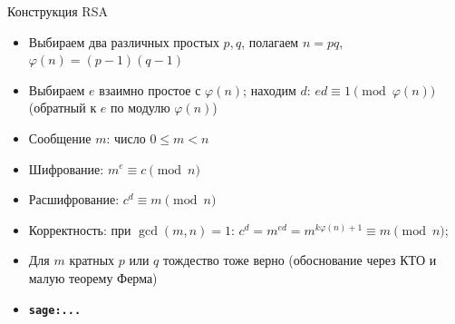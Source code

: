 \documentclass[serif, aspectratio=169]{beamer}
\newcommand{\sagemark}{%
  \textcolor{green!40!black}{\textbf{\texttt{sage:...}}}%
}
\begin{document}
\begin{frame}{Конструкция RSA}
    \begin{itemize}
        \item Выбираем два различных простых $p, q$, полагаем $n=pq$, $\varphi(n) = (p-1)(q-1)$
        \item Выбираем $e$ взаимно простое с $\varphi(n)$; находим $d$: $ed\equiv1\pmod{\varphi(n)}$ (обратный к $e$ по модулю $\varphi(n)$)
        \item Сообщение $m$: число $0\le m<n$
        \item Шифрование: $m^e \equiv c \pmod n$
        \item Расшифрование: $c^d \equiv m \pmod n$
        \item Корректность: при $\gcd(m,n)=1$: $c^d = m^{ed} = m^{k\varphi(n)+1} \equiv m \pmod n$;
        \item Для $m$ кратных $p$ или $q$ тождество тоже верно (обоснование через КТО и малую теорему Ферма)
        \item \sagemark
    \end{itemize}
\end{frame}
\end{document}
